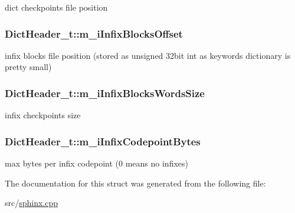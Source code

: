 dict checkpoints file position 

\hypertarget{structDictHeader__t_a0f7b83936bda4657de5c8076c3511e1a}{
\subsubsection[{m\-\_\-i\-Infix\-Blocks\-Offset}]{ Dict\-Header\-\_\-t\-::m\-\_\-i\-Infix\-Blocks\-Offset}}\label{structDictHeader__t_a0f7b83936bda4657de5c8076c3511e1a}


infix blocks file position (stored as unsigned 32bit int as keywords dictionary is pretty small) 

\hypertarget{structDictHeader__t_a93fa9cfe2aba1ee6e0a05045b4276417}{
\subsubsection[{m\-\_\-i\-Infix\-Blocks\-Words\-Size}]{ Dict\-Header\-\_\-t\-::m\-\_\-i\-Infix\-Blocks\-Words\-Size}}\label{structDictHeader__t_a93fa9cfe2aba1ee6e0a05045b4276417}


infix checkpoints size 

\hypertarget{structDictHeader__t_af40b69494a5b21f0bc19c2a81584fec8}{
\subsubsection[{m\-\_\-i\-Infix\-Codepoint\-Bytes}]{ Dict\-Header\-\_\-t\-::m\-\_\-i\-Infix\-Codepoint\-Bytes}}\label{structDictHeader__t_af40b69494a5b21f0bc19c2a81584fec8}


max bytes per infix codepoint (0 means no infixes) 



The documentation for this struct was generated from the following file\-:\begin{DoxyCompactItemize}
\item 
src/\hyperlink{sphinx_8cpp}{sphinx.\-cpp}\end{DoxyCompactItemize}
